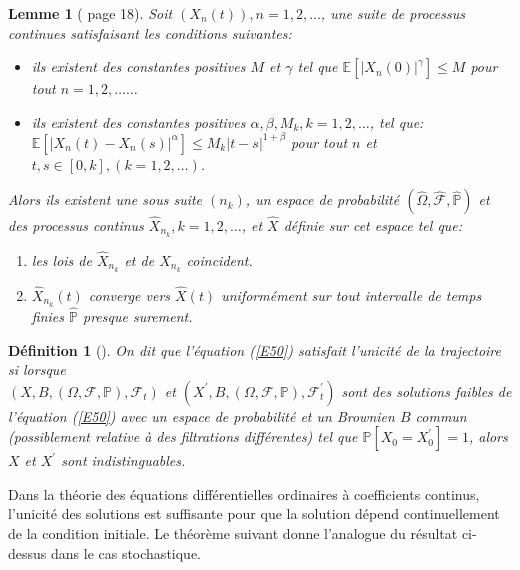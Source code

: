 \documentclass[A4paper,12pt]{report}
\newtheorem{definition}{D\'efinition}[chapter]
\newtheorem{lemma}{Lemme}[chapter]
\newcommand{\E}{{\mathbb{E}}}
\newcommand{\pr}{{\mathbb{P}}}
\begin{document}
\begin{lemma}[\cite{Ikeda} page 18] Soit $\left(X_{n}(t)\right), n=1,2, \ldots$, une suite de processus continues satisfaisant les conditions suivantes:
\begin{itemize}
\item[i)] ils existent des constantes positives $M$ et $\gamma$ tel que $\E\left[\left|X_{n}(0)\right|^{\gamma}\right] \leq M$ pour tout $n=1,2, \ldots \ldots$

\item[ii)] ils existent des constantes positives $\alpha, \beta, M_{k}, k=1,2, \ldots$, tel que: $\E\left[\left|X_{n}(t)-X_{n}(s)\right|^{\alpha}\right] \leq M_{k}|t-s|^{1+\beta}$ pour tout $n$ et $t, s \in[0, k],(k=1,2, \ldots)$.
\end{itemize}


Alors ils existent une sous suite $\left(n_{k}\right)$, un espace de probabilité  $(\widehat{\Omega}, \widehat{\mathcal{F}}, \widehat{\pr})$ et des  processus continus $\widehat{X}_{n_{k}}, k=1,2, \ldots$, et $\widehat{X}$ définie sur cet espace tel que:


\begin{enumerate}
  \item les lois de $\widehat{X}_{n_{k}}$ et de $X_{n_{k}}$ coincident.

  \item $\widehat{X}_{n_{k}}(t)$ converge vers $\widehat{X}(t)$ uniformément sur tout intervalle de temps finies $\widehat{\pr}$ presque surement.

\end{enumerate}
\end{lemma}\label{lem5}
\begin{definition}[\cite{Ouknine}]
On dit que l'équation  (\ref{E50}) satisfait l'unicité de la trajectoire si lorsque\\
 $\left(X, B,(\Omega, \mathcal{F}, \pr), \mathcal{F}_{t}\right)$ et $\left(X^{\prime}, B,(\Omega, \mathcal{F}, \pr), \mathcal{F}_{t}^{\prime}\right)$ sont des solutions faibles de l'équation (\ref{E50}) avec un espace de probabilité et un Brownien $B$ commun (possiblement relative à des filtrations différentes) tel que $\pr\left[X_{0}=X_{0}^{\prime}\right]=1$, alors $X$ et $X^{\prime}$ sont indistinguables.
\end{definition}
Dans la théorie des équations différentielles ordinaires à coefficients continus, l'unicité des solutions est suffisante pour que la solution dépend continuellement de la condition initiale. Le théorème suivant donne l'analogue du résultat ci-dessus dans le cas stochastique.
\end{document}
